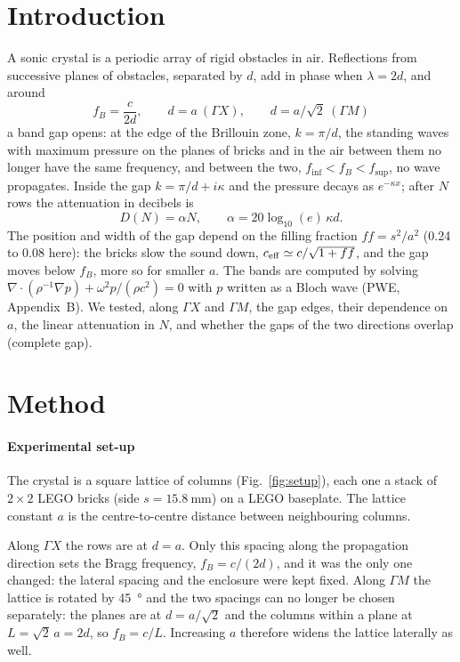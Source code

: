 \documentclass[9pt,a4paper,twocolumn]{extarticle}
\newcommand{\GX}{\ensuremath{\Gamma X}}
\newcommand{\GM}{\ensuremath{\Gamma M}}
\newcommand{\finf}{\ensuremath{f_{\mathrm{inf}}}}
\newcommand{\fsup}{\ensuremath{f_{\mathrm{sup}}}}
\begin{document}
\section{Introduction}
A sonic crystal is a periodic array of rigid obstacles in air. Reflections from successive planes of obstacles, separated by $d$, add in phase when $\lambda=2d$, and around
\begin{equation}
f_B=\frac{c}{2d},\qquad d=a\ (\GX),\qquad d=a/\sqrt2\ (\GM)
\end{equation}
a band gap opens: at the edge of the Brillouin zone, $k=\pi/d$, the standing waves with maximum pressure on the planes of bricks and in the air between them no longer have the same frequency, and between the two, $\finf<f_B<\fsup$, no wave propagates. Inside the gap $k=\pi/d+i\kappa$ and the pressure decays as $e^{-\kappa x}$; after $N$ rows the attenuation in decibels is
\begin{equation}
D(N)=\alpha N,\qquad \alpha=20\log_{10}(e)\,\kappa d.
\end{equation}
The position and width of the gap depend on the filling fraction $ff=s^2/a^2$ (0.24 to 0.08 here): the bricks slow the sound down, $c_{\rm eff}\simeq c/\sqrt{1+ff}$, and the gap moves below $f_B$, more so for smaller $a$. The bands are computed by solving $\nabla\!\cdot(\rho^{-1}\nabla p)+\omega^2p/(\rho c^2)=0$ with $p$ written as a Bloch wave (PWE, Appendix~B). We tested, along \GX{} and \GM, the gap edges, their dependence on $a$, the linear attenuation in $N$, and whether the gaps of the two directions overlap (complete gap).

\section{Method}

\paragraph{Experimental set-up}
The crystal is a square lattice of columns (Fig.~\ref{fig:setup}), each one a stack of $2\times2$ LEGO bricks (side $s = \SI{15.8}{\milli\metre}$) on a LEGO baseplate. The lattice constant $a$ is the centre-to-centre distance between neighbouring columns.

Along $\Gamma X$ the rows are at $d = a$. Only this spacing along the propagation direction sets the Bragg frequency, $f_B = c/(2d)$, and it was the only one changed: the lateral spacing and the enclosure were kept fixed. Along $\Gamma M$ the lattice is rotated by \SI{45}{\degree} and the two spacings can no longer be chosen separately: the planes are at $d = a/\sqrt{2}$ and the columns within a plane at $L = \sqrt{2}\,a = 2d$, so $f_B = c/L$. Increasing $a$ therefore widens the lattice laterally as well.
\end{document}
